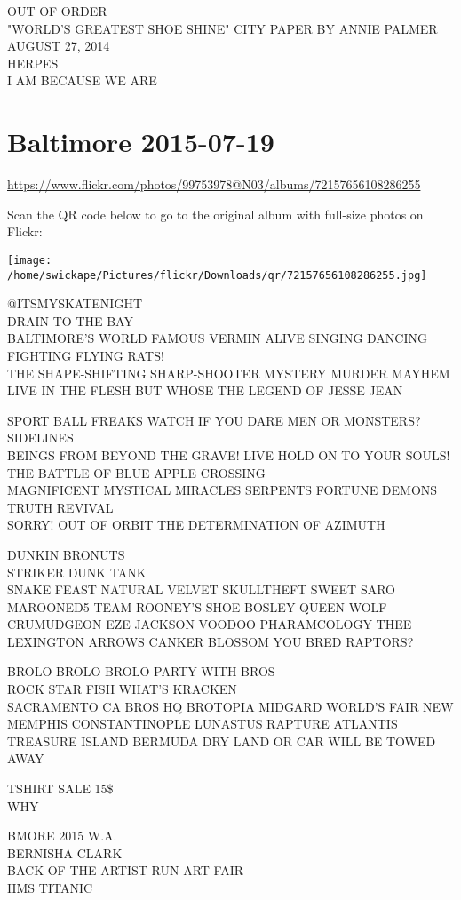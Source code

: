 \documentclass[10pt,letterpaper]{article}
\begin{document}
OUT OF ORDER\\
"WORLD'S GREATEST SHOE SHINE" CITY PAPER BY ANNIE PALMER AUGUST 27, 2014\\
HERPES\\
I AM BECAUSE WE ARE


\section*{Baltimore 2015-07-19}

\url{https://www.flickr.com/photos/99753978@N03/albums/72157656108286255}

Scan the QR code below to go to the original album with full-size photos on Flickr:

\texttt{[image: /home/swickape/Pictures/flickr/Downloads/qr/72157656108286255.jpg]}


@ITSMYSKATENIGHT\\
DRAIN TO THE BAY\\
BALTIMORE'S WORLD FAMOUS VERMIN ALIVE SINGING DANCING FIGHTING FLYING RATS!\\
THE SHAPE{-}SHIFTING SHARP{-}SHOOTER MYSTERY MURDER MAYHEM LIVE IN THE FLESH BUT WHOSE THE LEGEND OF JESSE JEAN

SPORT BALL FREAKS WATCH IF YOU DARE MEN OR MONSTERS?  SIDELINES\\
BEINGS FROM BEYOND THE GRAVE!   LIVE HOLD ON TO YOUR SOULS!  THE BATTLE OF BLUE APPLE CROSSING\\
MAGNIFICENT MYSTICAL MIRACLES SERPENTS FORTUNE DEMONS TRUTH REVIVAL\\
SORRY!  OUT OF ORBIT THE DETERMINATION OF AZIMUTH

DUNKIN BRONUTS\\
STRIKER DUNK TANK\\
SNAKE FEAST NATURAL VELVET SKULLTHEFT SWEET SARO MAROONED5 TEAM ROONEY'S SHOE BOSLEY QUEEN WOLF CRUMUDGEON EZE JACKSON VOODOO PHARAMCOLOGY THEE LEXINGTON ARROWS CANKER BLOSSOM YOU BRED RAPTORS?

BROLO BROLO BROLO PARTY WITH BROS\\
ROCK STAR FISH WHAT'S KRACKEN\\
SACRAMENTO CA BROS HQ BROTOPIA MIDGARD WORLD'S FAIR NEW MEMPHIS CONSTANTINOPLE LUNASTUS RAPTURE ATLANTIS TREASURE ISLAND BERMUDA DRY LAND OR CAR WILL BE TOWED AWAY

TSHIRT SALE 15\$\\
WHY

BMORE 2015 W.A.\\
BERNISHA CLARK\\
BACK OF THE ARTIST{-}RUN ART FAIR\\
HMS TITANIC
\end{document}
